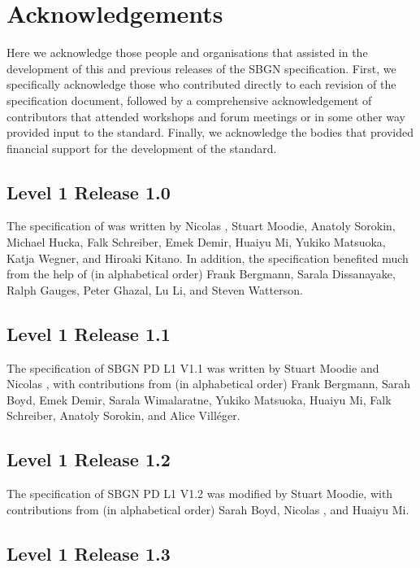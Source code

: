 \chapter{Acknowledgements}\label{sec:acknowledgements}

Here we acknowledge those people and organisations that assisted in the development of this and previous releases of the SBGN \PDl specification. First, we specifically acknowledge those who contributed directly to each revision of the  specification document, followed by a comprehensive acknowledgement of contributors that attended workshops and forum meetings or in some other way provided input to the standard. Finally, we acknowledge the bodies that provided financial support for the development of the standard.

\section{Level 1 Release 1.0}

The specification of was written by Nicolas \lenov{}, 
Stuart Moodie, Anatoly Sorokin, Michael Hucka, Falk Schreiber, Emek Demir, 
Huaiyu Mi, Yukiko Matsuoka, Katja Wegner, and Hiroaki Kitano. In addition, 
the specification benefited much from the help of (in alphabetical order) Frank Bergmann, Sarala 
Dissanayake, Ralph Gauges, Peter Ghazal, Lu Li, and Steven Watterson.

\section{Level 1 Release 1.1}

The specification of SBGN PD L1 V1.1 was written by Stuart Moodie and Nicolas \lenov{}, with contributions from (in alphabetical order) Frank Bergmann, Sarah Boyd, Emek Demir, Sarala Wimalaratne, Yukiko Matsuoka, Huaiyu Mi, Falk Schreiber, Anatoly Sorokin, and Alice Vill\'{e}ger.

\section{Level 1 Release 1.2}

The specification of SBGN PD L1 V1.2 was modified by Stuart Moodie, with contributions from (in alphabetical order) Sarah Boyd, Nicolas \lenov{}, and Huaiyu Mi.

\section{Level 1 Release 1.3}

